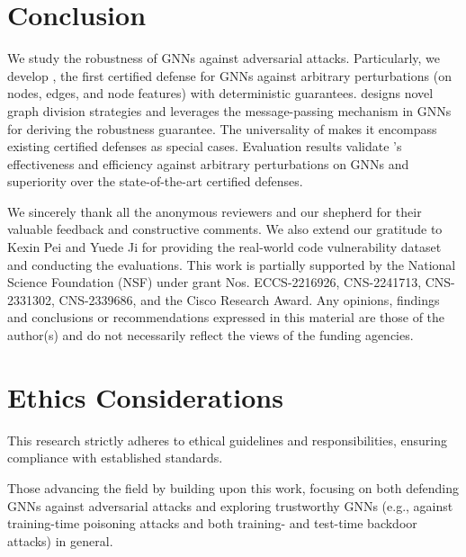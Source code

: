 \section{Conclusion}
\label{sec:conclusion}

We study the robustness of GNNs against adversarial attacks. Particularly, we develop {\name}, the first certified defense for GNNs against arbitrary perturbations (on nodes, edges, and node features) with deterministic guarantees. 
{\name} designs novel graph division strategies and  leverages the message-passing mechanism in GNNs for deriving the robustness guarantee. 
The universality of  {\name} makes it encompass existing certified defenses as special cases.  
Evaluation results validate  {\name}'s effectiveness and efficiency against arbitrary perturbations on GNNs and superiority over the state-of-the-art certified defenses. 

\vspace{+0.05in}
 We sincerely thank all the anonymous reviewers and our shepherd for their valuable feedback and constructive comments. We also extend our gratitude to Kexin Pei and Yuede Ji for providing the real-world code vulnerability dataset and conducting the evaluations.
This work is partially supported by the National Science Foundation (NSF) under grant Nos. ECCS-2216926, CNS-2241713, CNS-2331302, CNS-2339686, and the Cisco Research Award. 
Any opinions, findings and conclusions or recommendations expressed in this material are those of the author(s) and do not necessarily reflect the views of the funding agencies.



\section{Ethics Considerations}

This research strictly adheres to ethical guidelines and responsibilities, ensuring compliance with established standards.

\vspace{+0.1in}
\vspace{+0.05in}

 Those advancing the field by building upon this work, focusing on both defending GNNs against adversarial attacks and exploring trustworthy GNNs (e.g., against training-time poisoning attacks and both training- and test-time backdoor attacks) in general.

